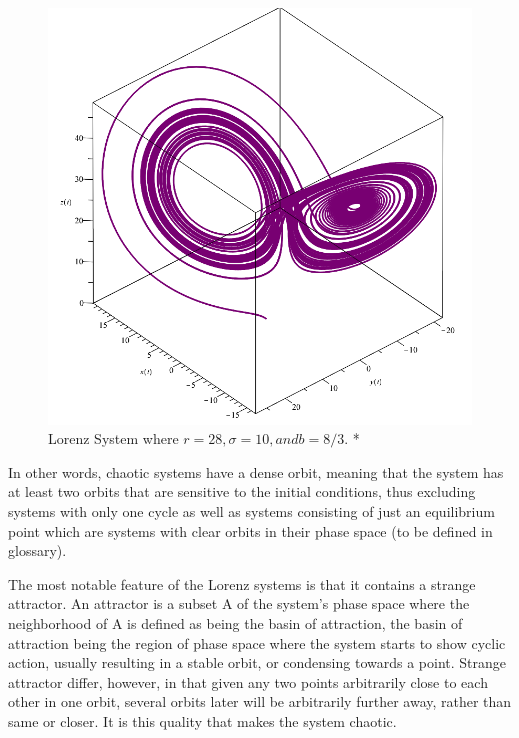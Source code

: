 \begin{figure}[H]
    \centering
	\includegraphics[width=\linewidth]{lorenz2.PNG}
	\caption{Lorenz System where $r = 28, \sigma = 10, and b = 8/3$. *}
	\label{fig:genLorenz}
\end{figure}

\par In other words, chaotic systems have a dense orbit, meaning that the system has at least two orbits that are sensitive to the initial conditions, thus excluding systems with only one cycle as well as systems consisting of just an equilibrium point which are systems with clear orbits in their phase space (to be defined in glossary). 

\par The most notable feature of the Lorenz systems is that it contains a strange attractor.  An attractor is a subset A of the system's phase space where the neighborhood of A is defined as being the basin of attraction, the basin of attraction being the region of phase space where the system starts to show cyclic action, usually resulting in a stable orbit, or condensing towards a point.  Strange attractor differ, however, in that given any two points arbitrarily close to each other in one orbit, several orbits later will be arbitrarily further away, rather than same or closer.  It is this quality that makes the system chaotic.

